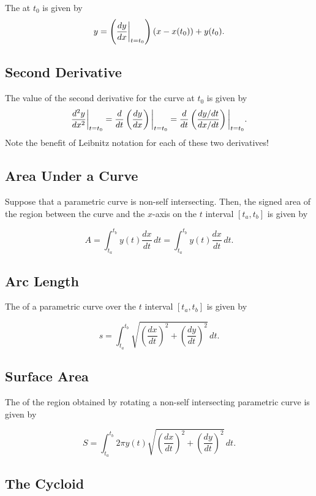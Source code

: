 \noindent The  at \(t_{0}\) is given by
\[
    y = \left(\dfrac{dy}{dx}\bigg|_{t = t_{0}}\right)(x - x(t_{0})) + y(t_{0}).
\]

\subsection{Second Derivative}

The value of the second derivative for the curve at \(t_{0}\) is given by
\[
    \dfrac{d^{2}y}{dx^{2}}\bigg|_{t = t_{0}} = \frac{d}{dt}\left(\dfrac{dy}{dx}\right)\bigg|_{t = t_{0}} = \frac{d}{dt}\left(\frac{dy/dt}{dx/dt}\right)\bigg|_{t = t_{0}}. \\
\]
Note the benefit of Leibnitz notation for each of these two derivatives!

\subsection{Area Under a Curve}

Suppose that a parametric curve is non-self intersecting. Then, the signed area of the region between the curve and the \(x\)-axis on the \(t\) interval \([t_{a},t_{b}]\) is given by 

\[
    A = \int_{t_{a}}^{t_{b}} y(t) \frac{dx}{dt} \, dt = \int_{t_{a}}^{t_{b}} y(t) \frac{dx}{dt} \, dt.
\]

\subsection{Arc Length}

The  of a parametric curve over the \(t\) interval \([t_{a},t_{b}]\) is given by

\[
    s = \int_{t_{a}}^{t_{b}} \sqrt{\left(\frac{dx}{dt}\right)^{2} + \left(\frac{dy}{dt}\right)^{2}} \, dt.
\]

\subsection{Surface Area}

The  of the region obtained by rotating a non-self intersecting parametric curve is given by

\[
    S = \int_{t_{a}}^{t_{b}} 2\pi y(t) \sqrt{\left(\frac{dx}{dt}\right)^{2} + \left(\frac{dy}{dt}\right)^{2}} \, dt.
\]

\subsection{The Cycloid}

